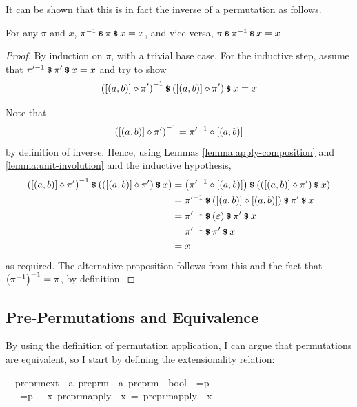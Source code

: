 It can be shown that this is in fact the inverse of a permutation as follows.
\begin{lemma}
\label{lemma:inverse-involution}
For any \(\pi\) and \(x\), \(\pi^{-1} \mathbin{\textrm{\footnotesize{\textbf{\$}}}} \pi \mathbin{\textrm{\footnotesize{\textbf{\$}}}} x = x\), and vice-versa, \(\pi \mathbin{\textrm{\footnotesize{\textbf{\$}}}} \pi^{-1} \mathbin{\textrm{\footnotesize{\textbf{\$}}}} x = x\).
\end{lemma}
\begin{proof}
By induction on \(\pi\), with a trivial base case.
For the inductive step, assume that \(\pi'^{-1} \mathbin{\textrm{\footnotesize{\textbf{\$}}}} \pi' \mathbin{\textrm{\footnotesize{\textbf{\$}}}} x = x\) and try to show
\[
\left([\left(a, b\right)] \diamond \pi'\right)^{-1} \mathbin{\textrm{\footnotesize{\textbf{\$}}}} \left([\left(a, b\right)] \diamond \pi'\right) \mathbin{\textrm{\footnotesize{\textbf{\$}}}} x = x
\]

Note that
\[
\left([\left(a, b\right)] \diamond \pi'\right)^{-1} = \pi'^{-1} \diamond [\left(a, b\right)]
\]
by definition of inverse.
Hence, using Lemmas \ref{lemma:apply-composition} and \ref{lemma:unit-involution} and the inductive hypothesis,
\begin{align*}
\left([\left(a, b\right)] \diamond \pi'\right)^{-1} \mathbin{\textrm{\footnotesize{\textbf{\$}}}} \left(\left([\left(a, b\right)] \diamond \pi'\right) \mathbin{\textrm{\footnotesize{\textbf{\$}}}} x\right)
&= \left(\pi'^{-1} \diamond [\left(a, b\right)]\right) \mathbin{\textrm{\footnotesize{\textbf{\$}}}} \left(\left([\left(a, b\right)] \diamond \pi'\right) \mathbin{\textrm{\footnotesize{\textbf{\$}}}} x\right)\\
&= \pi'^{-1} \mathbin{\textrm{\footnotesize{\textbf{\$}}}} \left([\left(a, b\right)] \diamond [\left(a, b\right)]\right) \mathbin{\textrm{\footnotesize{\textbf{\$}}}} \pi' \mathbin{\textrm{\footnotesize{\textbf{\$}}}} x\\
&= \pi'^{-1} \mathbin{\textrm{\footnotesize{\textbf{\$}}}} \left(\varepsilon\right) \mathbin{\textrm{\footnotesize{\textbf{\$}}}} \pi' \mathbin{\textrm{\footnotesize{\textbf{\$}}}} x\\
&= \pi'^{-1} \mathbin{\textrm{\footnotesize{\textbf{\$}}}} \pi' \mathbin{\textrm{\footnotesize{\textbf{\$}}}} x\\
&= x\\
\end{align*}
as required.
The alternative proposition follows from this and the fact that \(\left(\pi^{-1}\right)^{-1} = \pi\), by definition.
\end{proof}
\subsection{Pre-Permutations and Equivalence}
By using the definition of permutation application, I can argue that permutations are equivalent, so I start by defining the extensionality relation:

\begin{implementation}
\isamarkupfalse%
\isanewline
\ \ preprm{\isacharunderscore}ext\ {\isacharcolon}{\isacharcolon}\ {\isachardoublequoteopen}{\isacharprime}a\ preprm\ {\isasymRightarrow}\ {\isacharprime}a\ preprm\ {\isasymRightarrow}\ bool{\isachardoublequoteclose}\ {\isacharparenleft}\ {\isachardoublequoteopen}=p{\isachardoublequoteclose}\ {}{}{}{\isacharparenright}\isanewline
\ \ \isanewline
\ \ {\isachardoublequoteopen}{\isasympi}\ =p\ {\isasymsigma}\ {\isasymequiv}\ {\isasymforall}x{\isachardot}\ preprm{\isacharunderscore}apply\ {\isasympi}\ x\ =\ preprm{\isacharunderscore}apply\ {\isasymsigma}\ x{\isachardoublequoteclose}\isanewline
\end{implementation}

